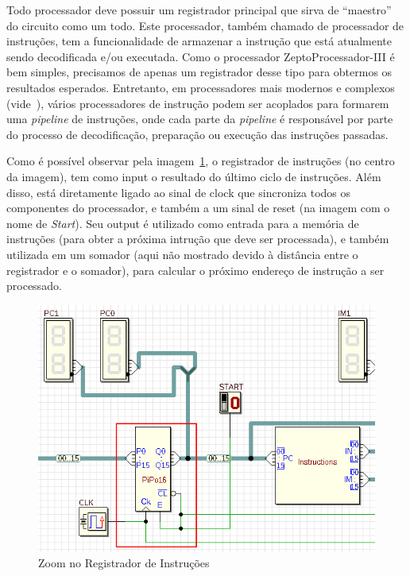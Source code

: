\documentclass[12pt]{article}
\begin{document}
Todo processador deve possuir um registrador principal que sirva de ``maestro''
do circuito como um todo. Este processador, também chamado de processador de
instruções, tem a funcionalidade de armazenar a instrução que está atualmente
sendo decodificada e/ou executada. Como o processador ZeptoProcessador-III é bem
simples, precisamos de apenas um registrador desse tipo para obtermos os
resultados esperados. Entretanto, em processadores mais modernos e complexos
(vide~\cite{Instruction_register}), vários processadores de instrução podem ser
acoplados para formarem uma \emph{pipeline} de instruções, onde cada parte da
\emph{pipeline} é responsável por parte do processo de decodificação, preparação
ou execução das instruções passadas.

Como é possível observar pela
imagem~\ref{fig:circuit__instruction_register.png}, o registrador de instruções
(no centro da imagem), tem como input o resultado do último ciclo de instruções.
Além disso, está diretamente ligado ao sinal de clock que sincroniza todos os
componentes do processador, e também a um sinal de reset (na imagem com o nome
de \emph{Start}). Seu output é utilizado como entrada para a memória de
instruções (para obter a próxima intrução que deve ser processada), e também
utilizada em um somador (aqui não mostrado devido à distância entre o
registrador e o somador), para calcular o próximo endereço de instrução a ser
processado.

\begin{figure}[H]
    \centering
    \includegraphics[width=.9\textwidth]{Projeto/images/circuit__instruction_register.png}
    \caption{Zoom no Registrador de Instruções}\label{fig:circuit__instruction_register.png}
\end{figure}
\end{document}
